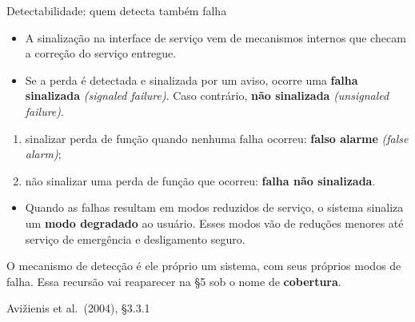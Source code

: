 \documentclass{beamer}
\newcommand{\en}[1]{{\color{depCinza}\textit{#1}}}
\newcommand{\sect}[1]{\par\smallskip\hfill{\tiny\color{black!55}Avi\v{z}ienis et al.\ (2004), #1}}
\begin{document}
\begin{frame}{Detectabilidade: quem detecta tamb\'em falha}
    \footnotesize
    \begin{itemize}
        \item A sinaliza\c{c}\~ao na interface de servi\c{c}o vem de mecanismos internos que checam a corre\c{c}\~ao do servi\c{c}o entregue.
        \item Se a perda \'e detectada e sinalizada por um aviso, ocorre uma \textbf{falha sinalizada} \en{(signaled failure)}. Caso contr\'ario, \textbf{n\~ao sinalizada} \en{(unsignaled failure)}.
    \end{itemize}
    \medskip
    \begin{defi}
        \scriptsize
        \begin{enumerate}
            \item sinalizar perda de fun\c{c}\~ao quando nenhuma falha ocorreu: \textbf{falso alarme} \en{(false alarm)};
            \item n\~ao sinalizar uma perda de fun\c{c}\~ao que ocorreu: \textbf{falha n\~ao sinalizada}.
        \end{enumerate}
    \end{defi}
    \medskip
    \begin{itemize}
        \item Quando as falhas resultam em modos reduzidos de servi\c{c}o, o sistema sinaliza um \textbf{modo degradado} ao usu\'ario. Esses modos v\~ao de redu\c{c}\~oes menores at\'e servi\c{c}o de emerg\^encia e desligamento seguro.
    \end{itemize}
    \medskip
    \begin{ancora}
        \footnotesize
        O mecanismo de detec\c{c}\~ao \'e ele pr\'oprio um sistema, com seus pr\'oprios modos de falha. Essa recurs\~ao vai reaparecer na \S5 sob o nome de \textbf{cobertura}.
    \end{ancora}
    \sect{\S3.3.1}
\end{frame}
\end{document}
